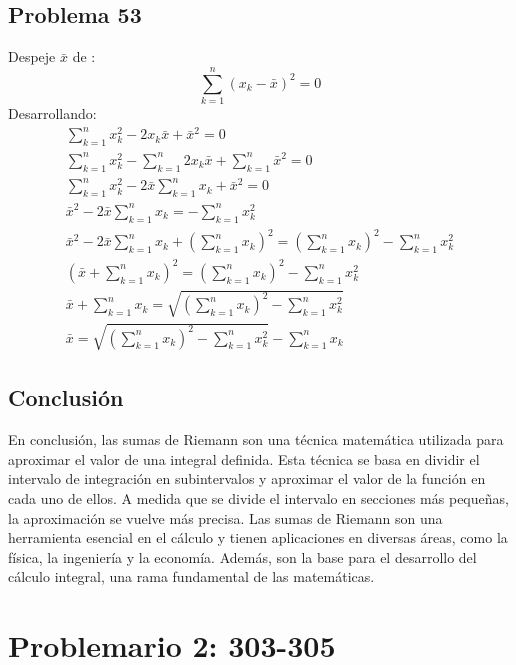 \documentclass{article}
\begin{document}
      \subsection{Problema 53}
      Despeje \(\bar{x}\) de :
      \begin{equation}
        \sum_{k=1}^{n}(x_k-\bar{x})^2 = 0
      \end{equation}
      Desarrollando: 
      \begin{align*}
        \sum_{k=1}^{n}x^2_k - 2x_k\bar{x} + \bar{x}^2=0 \\ \sum_{k=1}^{n}x^2_k -\sum_{k=1}^{n} 2x_k\bar{x} + \sum_{k=1}^{n} \bar{x}^2 = 0 \\ \sum_{k=1}^{n} x^2_k -2\bar{x}\sum_{k=1}^{n}x_k + \bar{x}^2=0 \\ \bar{x}^2-2\bar{x}\sum_{k=1}^{n}x_k = -\sum_{k=1}^{n} x^2_k \\ \bar{x}^2-2\bar{x}\sum_{k=1}^{n}x_k + \left(\sum_{k=1}^{n} x_k\right)^2 = \left(\sum_{k=1}^{n} x_k\right)^2 -\sum_{k=1}^{n} x^2_k \\ \left(\bar{x} + \sum_{k=1}^{n} x_k \right)^2 = \left(\sum_{k=1}^{n} x_k\right)^2 -\sum_{k=1}^{n} x^2_k \\ \bar{x} + \sum_{k=1}^{n} x_k = \sqrt{\left(\sum_{k=1}^{n} x_k\right)^2 -\sum_{k=1}^{n} x^2_k} \\ \bar{x} = \sqrt{\left(\sum_{k=1}^{n} x_k\right)^2 -\sum_{k=1}^{n} x^2_k} - \sum_{k=1}^{n} x_k
      \end{align*}
      \subsection{Conclusión}
      En conclusión, las sumas de Riemann son una técnica matemática utilizada para aproximar el valor de una integral definida. Esta técnica se basa en dividir el intervalo de integración en subintervalos y aproximar el valor de la función en cada uno de ellos. A medida que se divide el intervalo en secciones más pequeñas, la aproximación se vuelve más precisa. Las sumas de Riemann son una herramienta esencial en el cálculo y tienen aplicaciones en diversas áreas, como la física, la ingeniería y la economía. Además, son la base para el desarrollo del cálculo integral, una rama fundamental de las matemáticas.
      \section{Problemario 2: 303-305}
\end{document}

